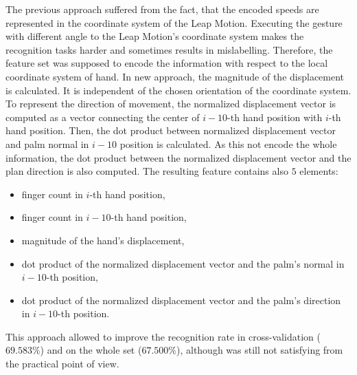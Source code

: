 The previous approach suffered from the fact, that the encoded speeds are represented in the coordinate system of the Leap Motion.
Executing the gesture with different angle to the Leap Motion's coordinate system makes the recognition tasks harder and sometimes results in mislabelling.
Therefore, the feature set was supposed to encode the information with respect to the local coordinate system of hand. 
In new approach, the magnitude of the displacement is calculated. 
It is independent of the chosen orientation of the coordinate system.
To represent the direction of movement, the normalized displacement vector is computed as a vector connecting the center of $i-10$-th hand position with $i$-th hand position.
Then, the dot product between normalized displacement vector and palm normal in $i-10$ position is calculated.
As this not encode the whole information, the dot product between the normalized displacement vector and the plan direction is also computed.
The resulting feature contains also $5$ elements:
\begin{itemize}
\item finger count in $i$-th hand position,
\item finger count in $i-10$-th hand position,
\item magnitude of the hand's displacement,
\item dot product of the normalized displacement vector and the palm's normal in $i-10$-th position,
\item dot product of the normalized displacement vector and the palm's direction in $i-10$-th position.
\end{itemize}
This approach allowed to improve the recognition rate in cross-validation ($69.583\%$) and on the whole set ($67.500\%$), although was still not satisfying from the practical point of view.

